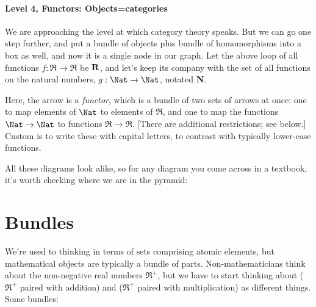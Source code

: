 \documentclass[11pt]{article}
\begin{document}
\paragraph{Level 4, Functors: Objects=categories}
We are approaching the level at which category theory speaks. But we can go one step
further, and put a bundle of objects plus bundle of homomorphisms into a box as well, and
now it is a single node in our graph. Let the above loop of all functions $f:\Re\to\Re$
be $\bf R$, and let's keep its company with the set of all functions on the natural
numbers, $g:\Nat\to\Nat$, notated {\bf N}.


Here, the arrow is a {\em functor}, which is a bundle of two sets of arrows at once:
one to map elements of $\Nat$ to elements of $\Re$, and one to map the functions
$\Nat\to \Nat$ to functions $\Re\to \Re$. [There are additional restrictions; see
below.] Custom is to write these with capital letters, to contrast with typically
lower-case functions.

All these diagrams look alike, so for any diagram you come across in a textbook, it's
worth checking where we are in the pyramid:

\section{Bundles}\label{bundlesec}
We're used to thinking in terms of sets comprising atomic elements, but mathematical
objects are typically a bundle of parts. Non-mathematicians think about the non-negative real numbers
$\Re^+$, but we have to start thinking about ($\Re^+$ paired with addition) and ($\Re^+$
paired with multiplication) as different things. Some bundles:

\end{document}
